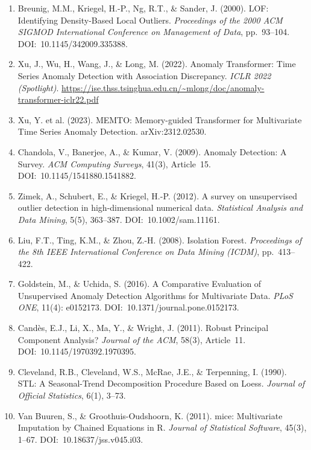 \documentclass[12pt,a4paper]{article}
\begin{document}
\begin{enumerate}

\item Breunig, M.M., Kriegel, H.-P., Ng, R.T., \& Sander, J. (2000).
LOF: Identifying Density-Based Local Outliers. \textit{Proceedings of the
2000 ACM SIGMOD International Conference on Management of Data},
pp.~93--104. DOI:~10.1145/342009.335388.

\item Xu, J., Wu, H., Wang, J., \& Long, M. (2022). Anomaly Transformer:
Time Series Anomaly Detection with Association Discrepancy. \textit{ICLR
2022 (Spotlight)}.
\url{https://ise.thss.tsinghua.edu.cn/~mlong/doc/anomaly-transformer-iclr22.pdf}

\item Xu, Y. et al. (2023). MEMTO: Memory-guided Transformer for Multivariate
Time Series Anomaly Detection. arXiv:2312.02530.

\item Chandola, V., Banerjee, A., \& Kumar, V. (2009). Anomaly Detection:
A Survey. \textit{ACM Computing Surveys}, 41(3), Article~15.
DOI:~10.1145/1541880.1541882.

\item Zimek, A., Schubert, E., \& Kriegel, H.-P. (2012). A survey on
unsupervised outlier detection in high-dimensional numerical data.
\textit{Statistical Analysis and Data Mining}, 5(5), 363--387.
DOI:~10.1002/sam.11161.

\item Liu, F.T., Ting, K.M., \& Zhou, Z.-H. (2008). Isolation Forest.
\textit{Proceedings of the 8th IEEE International Conference on Data Mining
(ICDM)}, pp.~413--422.

\item Goldstein, M., \& Uchida, S. (2016). A Comparative Evaluation of
Unsupervised Anomaly Detection Algorithms for Multivariate Data. \textit{PLoS
ONE}, 11(4): e0152173. DOI:~10.1371/journal.pone.0152173.

\item Candès, E.J., Li, X., Ma, Y., \& Wright, J. (2011). Robust Principal
Component Analysis? \textit{Journal of the ACM}, 58(3), Article~11.
DOI:~10.1145/1970392.1970395.

\item Cleveland, R.B., Cleveland, W.S., McRae, J.E., \& Terpenning, I. (1990).
STL: A Seasonal-Trend Decomposition Procedure Based on Loess.
\textit{Journal of Official Statistics}, 6(1), 3--73.

\item Van Buuren, S., \& Groothuis-Oudshoorn, K. (2011). mice: Multivariate
Imputation by Chained Equations in R. \textit{Journal of Statistical Software},
45(3), 1--67. DOI:~10.18637/jss.v045.i03.


\end{enumerate}
\end{document}

